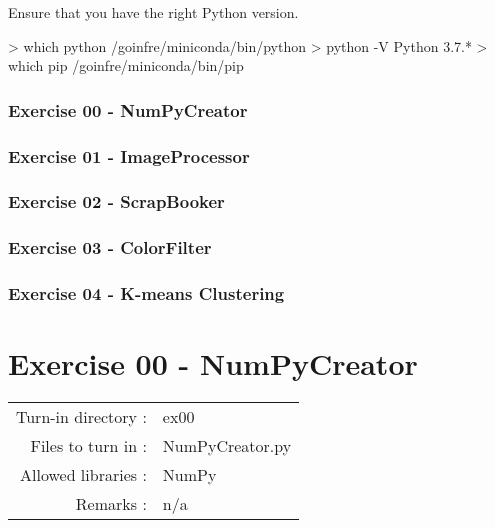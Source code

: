\documentclass[]{article}
\newenvironment{Shaded}{\begin{snugshade}}{\end{snugshade}}
\newcommand{\NormalTok}[1]{\textcolor[rgb]{0.81,0.81,0.76}{#1}}
\begin{document}
Ensure that you have the right Python version.

\begin{Shaded}
\begin{Highlighting}[]
\NormalTok{> which python}
\NormalTok{/goinfre/miniconda/bin/python}
\NormalTok{> python -V}
\NormalTok{Python 3.7.*}
\NormalTok{> which pip}
\NormalTok{/goinfre/miniconda/bin/pip}
\end{Highlighting}
\end{Shaded}

\hypertarget{exercise-00---numpycreator}{%
\subsubsection{Exercise 00 -
NumPyCreator}\label{exercise-00---numpycreator}}

\hypertarget{exercise-01---imageprocessor}{%
\subsubsection{Exercise 01 -
ImageProcessor}\label{exercise-01---imageprocessor}}

\hypertarget{exercise-02---scrapbooker}{%
\subsubsection{Exercise 02 -
ScrapBooker}\label{exercise-02---scrapbooker}}

\hypertarget{exercise-03---colorfilter}{%
\subsubsection{Exercise 03 -
ColorFilter}\label{exercise-03---colorfilter}}

\hypertarget{exercise-04---k-means-clustering}{%
\subsubsection{Exercise 04 - K-means
Clustering}\label{exercise-04---k-means-clustering}}

\clearpage

\hypertarget{exercise-00---numpycreator-1}{%
\section{Exercise 00 -
NumPyCreator}\label{exercise-00---numpycreator-1}}

\begin{longtable}[]{@{}rl@{}}
\toprule
\endhead
Turn-in directory : & ex00\tabularnewline
Files to turn in : & NumPyCreator.py\tabularnewline
Allowed libraries : & NumPy\tabularnewline
Remarks : & n/a\tabularnewline
\bottomrule
\end{longtable}
\end{document}
